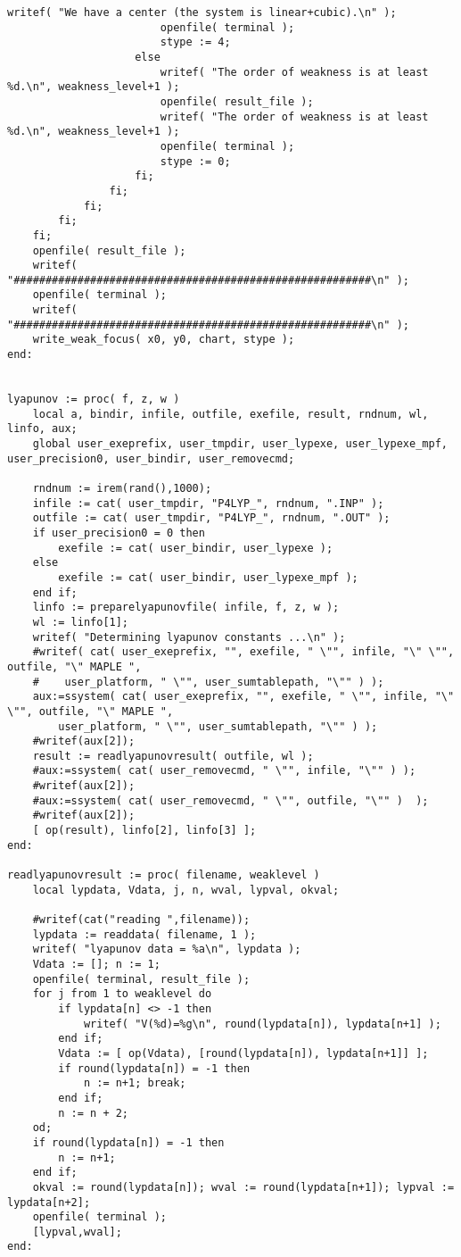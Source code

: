 \documentclass[a4paper,10pt]{article}
\begin{document}
\begin{lstlisting}[name=weakfocus]
                        writef( "We have a center (the system is linear+cubic).\n" );
                        openfile( terminal );
                        stype := 4;
                    else
                        writef( "The order of weakness is at least %d.\n", weakness_level+1 );
                        openfile( result_file );
                        writef( "The order of weakness is at least %d.\n", weakness_level+1 );
                        openfile( terminal );
                        stype := 0;
                    fi;
                fi;
            fi;
        fi;
    fi;
    openfile( result_file );
    writef( "########################################################\n" );
    openfile( terminal );
    writef( "########################################################\n" );
    write_weak_focus( x0, y0, chart, stype );
end:


lyapunov := proc( f, z, w )
    local a, bindir, infile, outfile, exefile, result, rndnum, wl, linfo, aux;
    global user_exeprefix, user_tmpdir, user_lypexe, user_lypexe_mpf, user_precision0, user_bindir, user_removecmd;

    rndnum := irem(rand(),1000);
    infile := cat( user_tmpdir, "P4LYP_", rndnum, ".INP" );
    outfile := cat( user_tmpdir, "P4LYP_", rndnum, ".OUT" );
    if user_precision0 = 0 then
        exefile := cat( user_bindir, user_lypexe );
    else
        exefile := cat( user_bindir, user_lypexe_mpf );
    end if;
    linfo := preparelyapunovfile( infile, f, z, w );
    wl := linfo[1];
    writef( "Determining lyapunov constants ...\n" );
    #writef( cat( user_exeprefix, "", exefile, " \"", infile, "\" \"", outfile, "\" MAPLE ",
    #    user_platform, " \"", user_sumtablepath, "\"" ) );
    aux:=ssystem( cat( user_exeprefix, "", exefile, " \"", infile, "\" \"", outfile, "\" MAPLE ",
        user_platform, " \"", user_sumtablepath, "\"" ) );
    #writef(aux[2]);
    result := readlyapunovresult( outfile, wl );
    #aux:=ssystem( cat( user_removecmd, " \"", infile, "\"" ) );
    #writef(aux[2]);
    #aux:=ssystem( cat( user_removecmd, " \"", outfile, "\"" )  );
    #writef(aux[2]);
    [ op(result), linfo[2], linfo[3] ];
end:

readlyapunovresult := proc( filename, weaklevel )
    local lypdata, Vdata, j, n, wval, lypval, okval;

    #writef(cat("reading ",filename));
    lypdata := readdata( filename, 1 );
    writef( "lyapunov data = %a\n", lypdata );
    Vdata := []; n := 1;
    openfile( terminal, result_file );
    for j from 1 to weaklevel do
        if lypdata[n] <> -1 then
            writef( "V(%d)=%g\n", round(lypdata[n]), lypdata[n+1] );
        end if;
        Vdata := [ op(Vdata), [round(lypdata[n]), lypdata[n+1]] ];
        if round(lypdata[n]) = -1 then
            n := n+1; break;
        end if;
        n := n + 2;
    od;
    if round(lypdata[n]) = -1 then
        n := n+1;
    end if;
    okval := round(lypdata[n]); wval := round(lypdata[n+1]); lypval := lypdata[n+2];
    openfile( terminal );
    [lypval,wval];
end:


\end{lstlisting}
\end{document}
